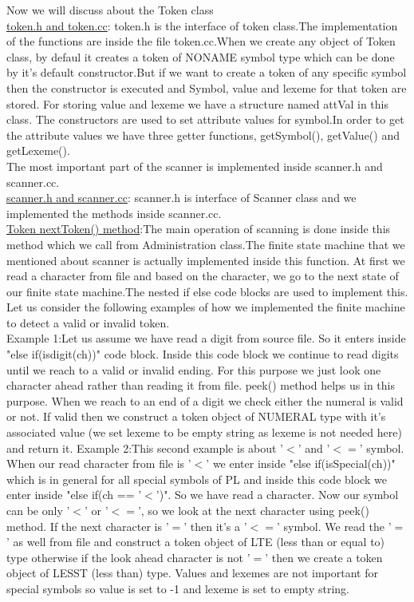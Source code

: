 \documentclass[paper=letter, fontsize=12pt]{scrartcl} %
\begin{document}
Now we will discuss about the Token class\\
\underline {token.h and token.cc}: token.h is the interface of token class.The implementation of the functions are inside the file token.cc.When we create any object of Token class, by defaul it creates a token of NONAME symbol type which can be done by it's default constructor.But if we want to create a token of any specific symbol then the constructor is executed and Symbol, value and lexeme for that token are stored. For storing value and lexeme we have a structure named attVal in this class. 
The constructors are used to set attribute values for symbol.In order to get the attribute values we have three getter functions, getSymbol(), getValue() and getLexeme().\\

The most important part of the scanner is implemented inside scanner.h and scanner.cc.\\
\underline {scanner.h and scanner.cc}: scanner.h is interface of Scanner class and we implemented the methods inside scanner.cc.\\

\underline {Token nextToken() method}:The main operation of scanning is done inside this method which we call from Administration class.The finite state machine that we mentioned about scanner is actually implemented inside this function.
At first we read a character from file and based on the character, we go to the next state of our finite state machine.The nested if else code blocks are used to implement this. Let us consider the following examples of how we implemented the finite machine to detect a valid or invalid token.\\

Example 1:Let us assume we have read a digit from source file. So it enters inside "else if(isdigit(ch))" code block. Inside this code block we continue to read digits until we reach to a valid or invalid ending. For this purpose we just look one character ahead rather than reading it from file. peek() method helps us in this purpose. When we reach to an end of a digit we check either the numeral is valid or not. If valid then we construct a token object of NUMERAL type with it's associated value (we set lexeme to be empty string as lexeme is not needed here) and return it. 
Example 2:This second example is about '$<$' and '$<=$' symbol. When our read character from file is '$<$' we enter inside "else if(isSpecial(ch))" which is in general for all special symbols of PL and inside this code block we enter inside "else if(ch == '$<$')". So we have read a character. Now our symbol can be only '$<$' or '$<=$', so we look at the next character using peek() method. If the next character is '$=$' then it's a '$<=$' symbol. We read the '$=$' as well from file and construct a token object of LTE (less than or equal to) type otherwise if the look ahead character is not '$=$' then we create a token object of LESST (less than) type. Values and lexemes are not important for special symbols so value is set to -1 and lexeme is set to empty string.\\
\end{document}
